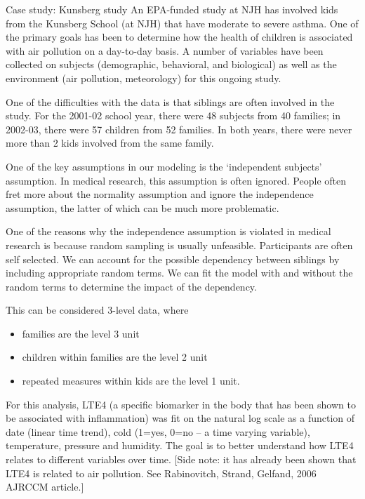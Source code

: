 \documentclass[
  9pt,
  ignorenonframetext,
]{beamer}
\begin{document}
\begin{frame}{Case study: Kunsberg study}
\protect\hypertarget{case-study-kunsberg-study}{}
An EPA-funded study at NJH has involved kids from the Kunsberg School
(at NJH) that have moderate to severe asthma. One of the primary goals
has been to determine how the health of children is associated with air
pollution on a day-to-day basis. A number of variables have been
collected on subjects (demographic, behavioral, and biological) as well
as the environment (air pollution, meteorology) for this ongoing study.

One of the difficulties with the data is that siblings are often
involved in the study. For the 2001-02 school year, there were 48
subjects from 40 families; in 2002-03, there were 57 children from 52
families. In both years, there were never more than 2 kids involved from
the same family.
\end{frame}

\begin{frame}{}
\protect\hypertarget{section-5}{}
One of the key assumptions in our modeling is the `independent subjects'
assumption. In medical research, this assumption is often ignored.
People often fret more about the normality assumption and ignore the
independence assumption, the latter of which can be much more
problematic.

One of the reasons why the independence assumption is violated in
medical research is because random sampling is usually unfeasible.
Participants are often self selected. We can account for the possible
dependency between siblings by including appropriate random terms. We
can fit the model with and without the random terms to determine the
impact of the dependency.
\end{frame}

\begin{frame}{}
\protect\hypertarget{section-6}{}
This can be considered 3-level data, where

\begin{itemize}
\item
  families are the level 3 unit
\item
  children within families are the level 2 unit
\item
  repeated measures within kids are the level 1 unit.
\end{itemize}

For this analysis, LTE4 (a specific biomarker in the body that has been
shown to be associated with inflammation) was fit on the natural log
scale as a function of date (linear time trend), cold (1=yes, 0=no -- a
time varying variable), temperature, pressure and humidity. The goal is
to better understand how LTE4 relates to different variables over time.
{[}Side note: it has already been shown that LTE4 is related to air
pollution. See Rabinovitch, Strand, Gelfand, 2006 AJRCCM article.{]}
\end{frame}
\end{document}
